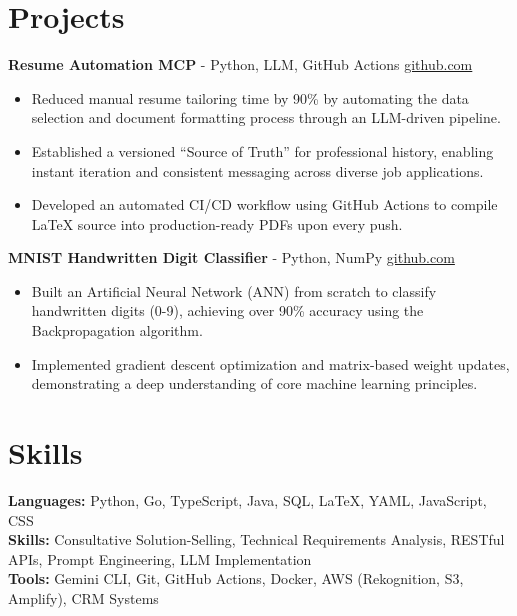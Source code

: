 \documentclass[11pt]{article}       %
\begin{document}
\vspace{-18.5pt}

\section*{Projects}

\textbf{Resume Automation MCP}{ - Python, LLM, GitHub Actions} \hfill \href{https://github.com/Monica20030707/Tex_OrangeLeaf-mcp}{github.com} \\
\vspace{-9pt}
\begin{itemize}
  \item Reduced manual resume tailoring time by 90\% by automating the data selection and document formatting process through an LLM-driven pipeline.
  \item Established a versioned ``Source of Truth'' for professional history, enabling instant iteration and consistent messaging across diverse job applications.
  \item Developed an automated CI/CD workflow using GitHub Actions to compile LaTeX source into production-ready PDFs upon every push.
\end{itemize}

\textbf{MNIST Handwritten Digit Classifier}{ - Python, NumPy} \hfill \href{https://github.com/Monica20030707/Artificial-Neutral-Network_ML}{github.com} \\
\vspace{-9pt}
\begin{itemize} 
  \item Built an Artificial Neural Network (ANN) from scratch to classify handwritten digits (0-9), achieving over 90\% accuracy using the Backpropagation algorithm.
  \item Implemented gradient descent optimization and matrix-based weight updates, demonstrating a deep understanding of core machine learning principles.
\end{itemize}

\vspace{-18.5pt}

\section*{Skills}
\textbf{Languages:} Python, Go, TypeScript, Java, SQL, LaTeX, YAML, JavaScript, CSS\\
\textbf{Skills:} Consultative Solution-Selling, Technical Requirements Analysis, RESTful APIs, Prompt Engineering, LLM Implementation\\
\textbf{Tools:} Gemini CLI, Git, GitHub Actions, Docker, AWS (Rekognition, S3, Amplify), CRM Systems\\

\vspace{-6.5pt}
\end{document}

